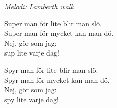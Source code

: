 {\footnotesize\textit{Melodi: Lamberth walk}}\par
\vspace{10pt}
Super man för lite blir man slö.\\
Super man för mycket kan man dö.\\
Nej, gör som jag:\\
sup lite varje dag!\par
\vspace{10pt}
Spyr man för lite blir man slö.\\
Spyr man för mycket kan man dö.\\
Nej, gör som jag:\\
spy lite varje dag!
